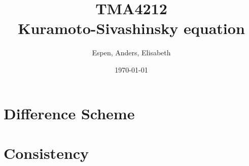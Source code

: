 \documentclass[16pt]{article}
\title{TMA4212 \\ Kuramoto-Sivashinsky equation}
\author{Espen, Anders, Elisabeth}
\date{\today}
\begin{document}
\huge





\section*{Difference Scheme}


\section*{Consistency}

\end{document}
